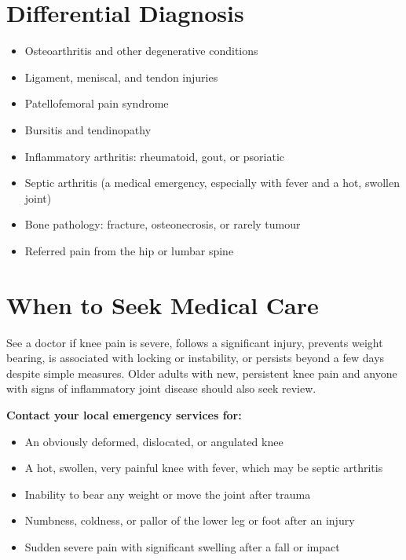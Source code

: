 \section*{Differential Diagnosis}
\begin{itemize}
    \item Osteoarthritis and other degenerative conditions
    \item Ligament, meniscal, and tendon injuries
    \item Patellofemoral pain syndrome
    \item Bursitis and tendinopathy
    \item Inflammatory arthritis: rheumatoid, gout, or psoriatic
    \item Septic arthritis (a medical emergency, especially with fever and a hot, swollen joint)
    \item Bone pathology: fracture, osteonecrosis, or rarely tumour
    \item Referred pain from the hip or lumbar spine
\end{itemize}

\section*{When to Seek Medical Care}
See a doctor if knee pain is severe, follows a significant injury, prevents weight bearing, is associated with locking or instability, or persists beyond a few days despite simple measures. Older adults with new, persistent knee pain and anyone with signs of inflammatory joint disease should also seek review.

\textbf{Contact your local emergency services for:}
\begin{itemize}
    \item An obviously deformed, dislocated, or angulated knee
    \item A hot, swollen, very painful knee with fever, which may be septic arthritis
    \item Inability to bear any weight or move the joint after trauma
    \item Numbness, coldness, or pallor of the lower leg or foot after an injury
    \item Sudden severe pain with significant swelling after a fall or impact
\end{itemize}

